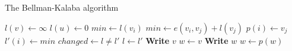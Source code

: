 \documentclass{article}
\begin{document}
\begin{algorithm}
\caption{The Bellman-Kalaba algorithm}
\begin{algorithmic}[1]
    \State $l(v) \leftarrow \infty$
  \EndFor
  \State $l(u) \leftarrow 0$
  \Repeat
      \State $min \leftarrow l(v_i)$
          \State $min \leftarrow e(v_i, v_j) + l(v_j)$
          \State $p(i) \leftarrow v_j$
        \EndIf
      \EndFor
      \State $l'(i) \leftarrow min$
    \EndFor
    \State $changed \leftarrow l \not= l'$
    \State $l \leftarrow l'$
\EndProcedure
\Statex
{}
    \State \textbf{Write} $v$
  \Else
    \State $w \leftarrow v$
      \State \textbf{Write} $w$
      \State $w \leftarrow p(w)$
    \EndWhile
  \EndIf
\EndProcedure
\end{algorithmic}
\end{algorithm}
\end{document}
